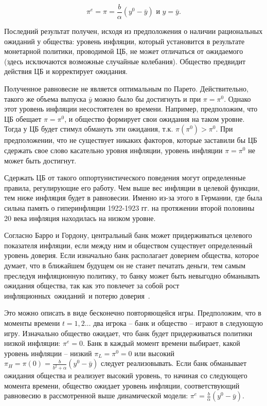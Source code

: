 \documentclass[14pt,a4paper, oneside]{extreport}
\theoremstyle{plain}              %
\theoremstyle{definition}         %
\begin{document}
\begin{equation}\label{T3-6}
\pi^e = \pi = \frac{b}{\alpha} (y^0 - \bar y) \mbox{ и } y = \bar y.
\end{equation}

Последний результат получен, исходя из предположения о наличии рациональных ожиданий у общества: уровень инфляции, который установится в результате монетарной политики, проводимой ЦБ, не может отличаться от ожидаемого (здесь исключаются возможные случайные колебания). Общество предвидит действия ЦБ и корректирует ожидания. 

Полученное равновесие не является оптимальным по Парето. Действительно, такого же объема выпуска $\bar y$ можно было бы достигнуть и при $\pi=\pi^0$. Однако этот уровень инфляции несостоятелен во времени. Например, предположим, что ЦБ обещает $\pi=\pi^0$, и общество формирует свои ожидания на таком уровне. Тогда у ЦБ будет стимул обмануть эти ожидания, т.к. $\pi(\pi^0)>\pi^0$. При предположении, что не существует никаких факторов, которые заставили бы ЦБ сдержать свое слово касательно уровня инфляции, уровень инфляции $\pi=\pi^0$ не может быть достигнут.

Сдержать ЦБ от такого оппортунистического поведения могут определенные правила, регулирующие его работу. Чем выше вес инфляции в целевой функции, тем ниже инфляция будет в равновесии. Именно из-за этого в Германии, где была сильна память о гиперинфляции 1922-1923 гг. на протяжении второй половины 20 века инфляция находилась на низком уровне.

Согласно Барро и Гордону, центральный банк может придерживаться целевого показателя инфляции, если между ним и обществом существует определенный уровень доверия. Если изначально банк располагает доверием общества, которое думает, что в ближайшем будущем он не станет печатать деньги, тем самым преследуя инфляционную политику, то банку может быть невыгодно обманывать ожидания общества, так как это повлечет за собой рост инфляционных~ожиданий~и потерю доверия~\cite{barro1981positive}. 

Это можно описать в виде бесконечно повторяющейся игры. Предположим, что в моменты времени $ t=1,2…$  два игрока – банк и общество – играют в следующую игру. Изначально общество ожидает, что банк будет придерживаться политики низкой инфляции: $\pi^e=0$. Банк в каждый момент времени выбирает, какой уровень инфляции – низкий $\pi_L=\pi^0=0$ или высокий $\pi_H=\pi(0)=\frac{b}{b^2+\alpha} (y^0 - \bar y)$  следует реализовывать. Если банк обманывает ожидания общества и реализует высокий уровень, то начиная со следующего момента времени, общество ожидает уровень инфляции, соответствующий равновесию в рассмотренной выше динамической модели: $\pi^e=\frac{b}{\alpha} (y^0- \bar y)$.
\end{document}
